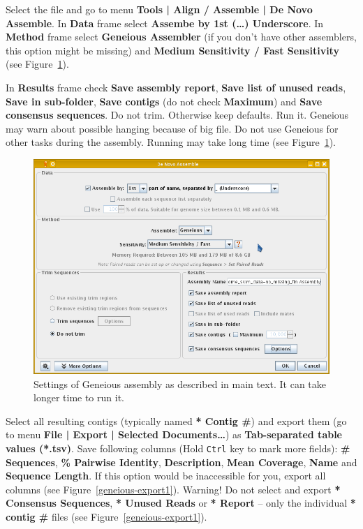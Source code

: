 \documentclass[a4paper, 11pt, twoside]{article}
\begin{document}
Select the file and go to menu \textbf{Tools | Align / Assemble | De Novo Assemble}. In \textbf{Data} frame select \textbf{Assembe by 1st (\ldots) Underscore}. In \textbf{Method} frame select \textbf{Geneious Assembler} (if you don't have other assemblers, this option might be missing) and \textbf{Medium Sensitivity / Fast Sensitivity} (see Figure~\ref{geneious-assembly}).

In \textbf{Results} frame check \textbf{Save assembly report}, \textbf{Save list of unused reads}, \textbf{Save in sub-folder}, \textbf{Save contigs} (do not check \textbf{Maximum}) and \textbf{Save consensus sequences}. Do not trim. Otherwise keep defaults. Run it. Geneious may warn about possible hanging because of big file. Do not use Geneious for other tasks during the assembly. Running may take long time (see Figure~\ref{geneious-assembly}).

\begin{figure}[htb]
  \begin{center}
    \includegraphics[width=12cm]{geneious2.png}
  \end{center}
  \caption[Settings of Geneious assembly]{Settings of Geneious assembly as described in main text. It can take longer time to run it.}
  \label{geneious-assembly}
\end{figure}

Select all resulting contigs (typically named \textbf{* Contig \#}) and export them (go to menu \textbf{File | Export | Selected Documents\ldots}) as \textbf{Tab-separated table values (*.tsv)}. Save following columns (Hold \texttt{Ctrl} key to mark more fields): \textbf{\# Sequences}, \textbf{\% Pairwise Identity}, \textbf{Description}, \textbf{Mean Coverage}, \textbf{Name} and \textbf{Sequence Length}. If this option would be inaccessible for you, export all columns (see Figure~\ref{geneious-export1}). Warning! Do not select and export \textbf{* Consensus Sequences}, \textbf{* Unused Reads} or \textbf{* Report} -- only the individual \textbf{* contig \#} files (see Figure~\ref{geneious-export1}).
\end{document}
